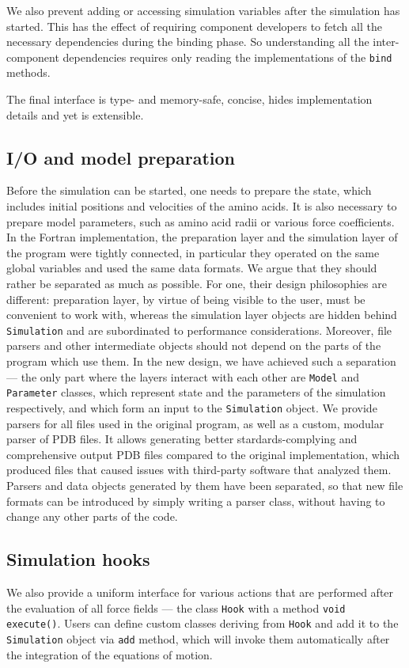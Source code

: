 We also prevent adding or accessing simulation variables after the simulation has started. This has the effect of requiring component developers to fetch all the necessary dependencies during the binding phase. So understanding all the inter-component dependencies requires only reading the implementations of the \texttt{bind} methods.

The final interface is type- and memory-safe, concise, hides implementation details and yet is extensible.

\subsection{I/O and model preparation}
Before the simulation can be started, one needs to prepare the state, which includes initial positions and velocities of the amino acids. It is also necessary to prepare model parameters, such as amino acid radii or various force coefficients. In the Fortran implementation, the preparation layer and the simulation layer of the program were tightly connected, in particular they operated on the same global variables and used the same data formats. We argue that they should rather be separated as much as possible. For one, their design philosophies are different: preparation layer, by virtue of being visible to the user, must be convenient to work with, whereas the simulation layer objects are hidden behind \texttt{Simulation} and are subordinated to performance considerations. Moreover, file parsers and other intermediate objects should not depend on the parts of the program which use them. In the new design, we have achieved such a separation --- the only part where the layers interact with each other are \texttt{Model} and \texttt{Parameter} classes, which represent state and the parameters of the simulation respectively, and which form an input to the \texttt{Simulation} object. We provide parsers for all files used in the original program, as well as a custom, modular parser of PDB files. It allows generating better stardards-complying and comprehensive output PDB files compared to the original implementation, which produced files that caused issues with third-party software that analyzed them. Parsers and data objects generated by them have been separated, so that new file formats can be introduced by simply writing a parser class, without having to change any other parts of the code.

\subsection{Simulation hooks}
We also provide a uniform interface for various actions that are performed after the evaluation of all force fields --- the class \texttt{Hook} with a method \texttt{void execute()}. Users can define custom classes deriving from \texttt{Hook} and add it to the \texttt{Simulation} object via \texttt{add} method, which will invoke them automatically after the integration of the equations of motion.

